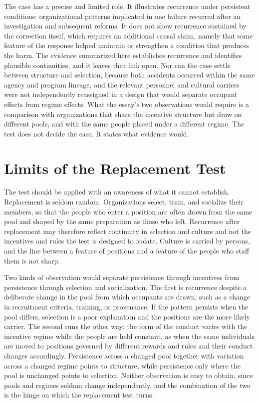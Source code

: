 \documentclass[11pt]{article}
\theoremstyle{definition}
\begin{document}
The case has a precise and limited role. It illustrates recurrence under persistent conditions: organizational patterns implicated in one failure recurred after an investigation and subsequent reforms. It does not show recurrence sustained by the correction itself, which requires an additional causal claim, namely that some feature of the response helped maintain or strengthen a condition that produces the harm. The evidence summarized here establishes recurrence and identifies plausible continuities, and it leaves that link open. Nor can the case settle between structure and selection, because both accidents occurred within the same agency and program lineage, and the relevant personnel and cultural carriers were not independently reassigned in a design that would separate occupant effects from regime effects. What the essay's two observations would require is a comparison with organizations that share the incentive structure but draw on different pools, and with the same people placed under a different regime. The test does not decide the case. It states what evidence would.

\section{Limits of the Replacement Test}

The test should be applied with an awareness of what it cannot establish. Replacement is seldom random. Organizations select, train, and socialize their members, so that the people who enter a position are often drawn from the same pool and shaped by the same preparation as those who left. Recurrence after replacement may therefore reflect continuity in selection and culture and not the incentives and rules the test is designed to isolate. Culture is carried by persons, and the line between a feature of positions and a feature of the people who staff them is not sharp.

Two kinds of observation would separate persistence through incentives from persistence through selection and socialization. The first is recurrence despite a deliberate change in the pool from which occupants are drawn, such as a change in recruitment criteria, training, or provenance. If the pattern persists when the pool differs, selection is a poor explanation and the positions are the more likely carrier. The second runs the other way: the form of the conduct varies with the incentive regime while the people are held constant, as when the same individuals are moved to positions governed by different rewards and rules and their conduct changes accordingly. Persistence across a changed pool together with variation across a changed regime points to structure, while persistence only where the pool is unchanged points to selection. Neither observation is easy to obtain, since pools and regimes seldom change independently, and the combination of the two is the hinge on which the replacement test turns.
\end{document}
